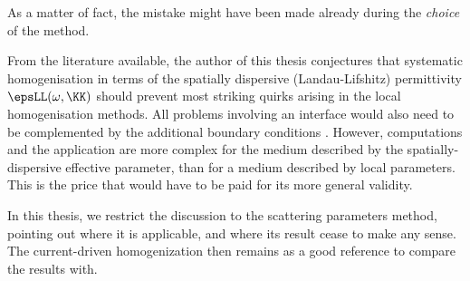 As a matter of fact, the mistake might have been made already during the \textit{choice} of the method.

From the literature available, the author of this thesis conjectures that systematic homogenisation in terms of the spatially dispersive (Landau-Lifshitz) permittivity $\epsLL(\omega,\KK)$ should prevent most striking quirks arising in the local homogenisation methods. All problems involving an interface would also need to be complemented by the additional boundary conditions \cite{agranovich2006spatial}.
However, computations and the application are more complex for the medium described by the spatially-dispersive effective parameter, than for a medium described by local parameters. This is the price that would have to be paid for its more general validity.

In this thesis, we restrict the discussion to the scattering parameters method, pointing out where it is applicable, and where its result cease to make any sense. The current-driven homogenization then remains as a good reference to compare the results with.


